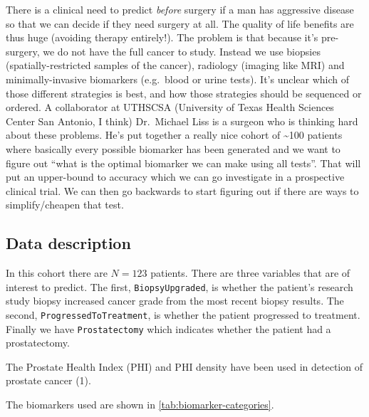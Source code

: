 \documentclass[]{article}
\begin{document}
There is a clinical need to predict \emph{before} surgery if a man has aggressive disease so that we can decide if they need surgery at all. The quality of life benefits are thus huge (avoiding therapy entirely!). The problem is that because it's pre-surgery, we do not have the full cancer to study. Instead we use biopsies (spatially-restricted samples of the cancer), radiology (imaging like MRI) and minimally-invasive biomarkers (e.g.~blood or urine tests). It's unclear which of those different strategies is best, and how those strategies should be sequenced or ordered. A collaborator at UTHSCSA (University of Texas Health Sciences Center San Antonio, I think) Dr.~Michael Liss is a surgeon who is thinking hard about these problems. He's put together a really nice cohort of \textasciitilde{}100 patients where basically every possible biomarker has been generated and we want to figure out \enquote{what is the optimal biomarker we can make using all tests}. That will put an upper-bound to accuracy which we can go investigate in a prospective clinical trial. We can then go backwards to start figuring out if there are ways to simplify/cheapen that test.

\hypertarget{data-description}{%
\subsection{Data description}\label{data-description}}

In this cohort there are \(N = 123\) patients.
There are three variables that are of interest to predict.
The first, \texttt{BiopsyUpgraded}, is whether the patient's research study biopsy increased cancer grade from the most recent biopsy results.
The second, \texttt{ProgressedToTreatment}, is whether the patient progressed to treatment.
Finally we have \texttt{Prostatectomy} which indicates whether the patient had a prostatectomy.

The Prostate Health Index (PHI) and PHI density have been used in detection of prostate cancer (1).

The biomarkers used are shown in \ref{tab:biomarker-categories}.
\end{document}
